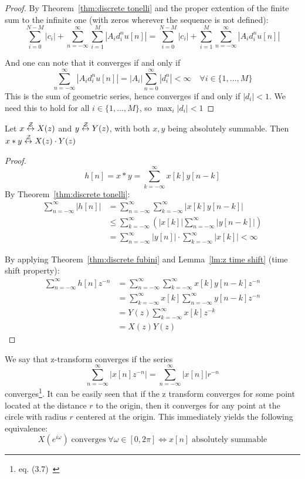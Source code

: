 \begin{proof}
    By Theorem~\ref{thm:discrete tonelli} and the proper extention of the finite sum to the infinite one (with zeros wherever the sequence is not defined):
    \[\sum_{i = 0}^{N-M} |c_i| + \sum_{n=-\infty}^{\infty} \sum_{i=1}^{M} |A_i d_i^n u[n]|
        = \sum_{i = 0}^{N-M} |c_i| +  \sum_{i=1}^{M} \sum_{n=-\infty}^{\infty} |A_i d_i^n u[n]|\]

    And one can note that it converges if and only if
    \[\sum_{n=-\infty}^{\infty} |A_i d_i^n u[n]|
        = |A_i| \sum_{n=0}^{\infty} |d_i^n| < \infty
        \quad \forall i \in \{1, \dots, M\}\]
    This is the sum of geometric series, hence converges if and only if $|d_i|<1$. We need this to hold for all $i\in \{1, \dots, M\}$, so $\max_{i} |d_i| < 1$
\end{proof}
\begin{theorem} \label{thm:convolution theorem z transform}
    Let $x \overset{\mathcal{Z}}{\leftrightarrow} X(z)$ and $y \overset{\mathcal{Z}}{\leftrightarrow} Y(z)$, with both $x,y$ being absolutely summable. Then $x \ast y \overset{\mathcal{Z}}{\leftrightarrow} X(z)\cdot Y(z)$
\end{theorem}
\begin{proof}
    \[
        h[n] = x \ast y
        = \sum_{k=-\infty}^{\infty} x[k] y[n-k]\]
    By Theorem~\ref{thm:discrete tonelli}:
    \begin{align*}
        \sum_{n=-\infty}^{\infty} |h[n]|
         & = \sum_{n=-\infty}^{\infty} \sum_{k=-\infty}^{\infty} |x[k] y[n-k]|
        \\ &\leq \sum_{k=-\infty}^{\infty} \left( |x[k]| \sum_{n=-\infty}^{\infty} |y[n-k]| \right)
        \\ &= \sum_{n=-\infty}^{\infty} |y[n]| \cdot \sum_{k=-\infty}^{\infty} |x[k]| < \infty
    \end{align*}

    By applying Theorem~\ref{thm:discrete fubini} and Lemma~\ref{lm:z time shift} (time shift property):
    \begin{align*}
        \sum_{n=-\infty}^{\infty} h[n] z^{-n}
         & = \sum_{n=-\infty}^{\infty} \sum_{k=-\infty}^{\infty} x[k] y[n-k] z^{-n}
        \\ &= \sum_{k=-\infty}^{\infty} x[k] \sum_{n=-\infty}^{\infty} y[n-k] z^{-n}
        \\ &= Y(z) \sum_{k=-\infty}^{\infty} x[k] z^{-k}
        \\ &= X(z) Y(z)
    \end{align*}
\end{proof}

We say that z-transform converges if the series
\[\sum_{n=-\infty}^{\infty} |x[n]z^{-n}| = \sum_{n=-\infty}^{\infty} |x[n]|r^{-n}\]
converges\footnote{eq. (3.7)~\cite{oppenheim2010discrete}}. It can be easily seen that if the z transform converges for some point located at the distance $r$ to the origin, then it converges for any point at the circle with radius $r$ centered at the origin. This immediately yields the following equivalence:
\[X(e^{i\omega})\;\text{converges}\; \forall \omega \in [0, 2\pi] \Leftrightarrow x[n]\;\text{absolutely summable}\]


